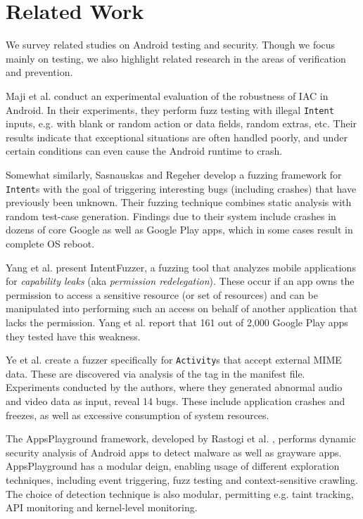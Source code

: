 \section{Related Work}\label{Se:related}

We survey related studies on Android testing and security. Though we  focus mainly on testing, we also highlight related research in the areas of verification and prevention.

 Maji et al. \cite{MAB:DSN12} conduct an experimental evaluation of the robustness of IAC in Android. In their experiments, they perform fuzz testing with illegal {\tt Intent} inputs, e.g. with blank or random action or data fields, random extras, etc. Their results indicate that exceptional situations are often handled poorly, and under certain conditions can even cause the Android runtime to crash.

Somewhat similarly, Sasnauskas and Regeher \cite{SR:WODA14} develop a fuzzing framework for {\tt Intent}s with the goal of triggering interesting bugs (including crashes) that have previously been unknown. Their fuzzing technique combines static analysis with random test-case generation. Findings due to their system include crashes in dozens of core Google as well as Google Play apps, which in some cases result in complete OS reboot.

Yang et al. \cite{YZWZD:ACCS14} present IntentFuzzer, a fuzzing tool that analyzes mobile applications for \emph{capability leaks} (aka \emph{permission redelegation}). These occur if an app owns the permission to access a sensitive resource (or set of resources) and can be manipulated into performing such an access on behalf of another application that lacks the permission. Yang et al. report that 161 out of 2,000 Google Play apps they tested have this weakness.

Ye et al. \cite{YCZJ:MOMM13} create a fuzzer specifically for {\tt Activity}s that accept external MIME data. These are discovered via analysis of the {\tt <intent-filter>} tag in the manifest file. Experiments conducted by the authors, where they generated abnormal audio and video data as input, reveal 14 bugs. These include application crashes and freezes, as well as excessive consumption of system resources.

The AppsPlayground framework, developed by Rastogi et al. \cite{RCE:CODAPSY13}, performs dynamic security analysis of Android apps to detect malware as well as grayware apps.  AppsPlayground has a modular deign, enabling usage of different exploration techniques, including event triggering, fuzz testing and context-sensitive crawling. The choice of detection technique is also modular, permitting e.g. taint tracking, API monitoring and kernel-level monitoring. 

